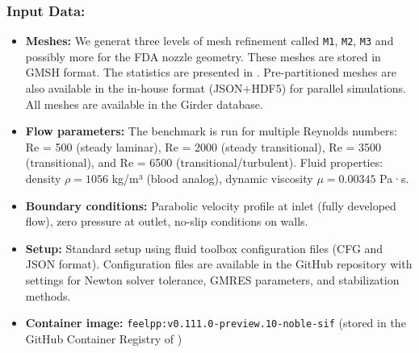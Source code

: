 \subsubsection{Input Data:}
  \begin{itemize}
  \item \textbf{Meshes:} We  generat three levels of mesh refinement called \texttt{M1}, \texttt{M2}, \texttt{M3} and possibly more for the FDA nozzle geometry. 
  These meshes are stored in GMSH format. The statistics are presented in . Pre-partitioned meshes are also available in the \Feelpp in-house format (JSON+HDF5) for parallel simulations. All meshes are available in the \Feelpp Girder database.
  
  \item \textbf{Flow parameters:} The benchmark is run for multiple Reynolds numbers: Re = 500 (steady laminar), Re = 2000 (steady transitional), Re = 3500 (transitional), and Re = 6500 (transitional/turbulent). Fluid properties: density $\rho = 1056$ kg/m³ (blood analog), dynamic viscosity $\mu = 0.00345$ Pa·s.
  
  \item \textbf{Boundary conditions:} Parabolic velocity profile at inlet (fully developed flow), zero pressure at outlet, no-slip conditions on walls.
  
  \item \textbf{Setup:} Standard setup using \Feelpp fluid toolbox configuration files (CFG and JSON format). Configuration files are available in the \Feelpp GitHub repository with settings for Newton solver tolerance, GMRES parameters, and stabilization methods.
  
  \item \textbf{Container image:} \texttt{feelpp:v0.111.0-preview.10-noble-sif} (stored in the GitHub Container Registry of \Feelpp)
  \end{itemize}

